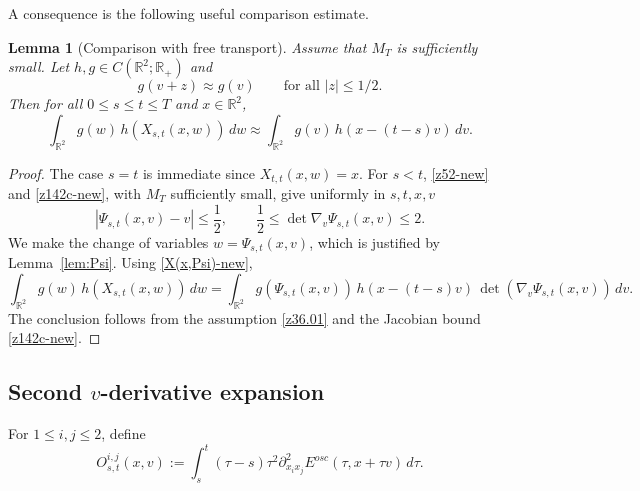 \documentclass[reqno,11pt]{amsart}
\numberwithin{equation}{section}
\newtheorem{lemma}[theorem]{Lemma}
\begin{document}
A consequence is the following useful comparison estimate.
	
	\begin{lemma}[Comparison with free transport]\label{lem:change-var}
		Assume that $M_T$ is sufficiently small.
		Let $h,g\in C(\mathbb{R}^2;\mathbb{R}_+)$ and
		\begin{equation}\label{z36.01}
		g(v+z)\approx g(v)\qquad\text{for all }|z|\leq 1/2.
		\end{equation}
		Then for all $0\leq s\leq t\leq T$ and $x\in\mathbb R^2$,
		\begin{equation}\label{z36}
			\int_{\mathbb{R}^2} g(w)\,h(X_{s,t}(x,w))\,dw\approx \int_{\mathbb{R}^2} g(v)\,h(x-(t-s)v)\,dv.
		\end{equation}
	\end{lemma}
	\begin{proof}
		The case $s=t$ is immediate since $X_{t,t}(x,w)=x$.
		For $s<t$, \eqref{z52-new} and \eqref{z142c-new}, with $M_T$
		sufficiently small, give uniformly in $s,t,x,v$
		\[
		|\Psi_{s,t}(x,v)-v|\leq\frac12,\qquad
		\frac12\leq\det\nabla_v\Psi_{s,t}(x,v)\leq2.
		\]
		We make the change of variables $w=\Psi_{s,t}(x,v)$, which is justified by Lemma~\ref{lem:Psi}. Using \eqref{X(x,Psi)-new},
		\[
		\int_{\mathbb{R}^2} g(w)\,h(X_{s,t}(x,w))\,dw
		=
		\int_{\mathbb{R}^2} g(\Psi_{s,t}(x,v))\,h(x-(t-s)v)\,\det(\nabla_v\Psi_{s,t}(x,v))\,dv.
		\]
		The conclusion follows from the assumption \eqref{z36.01} and the Jacobian bound \eqref{z142c-new}.
	\end{proof}
	
	\subsection{Second $v$-derivative expansion}
	
	For $1\le i,j\le2$, define
	\begin{equation}\label{sec4eq50}
		O_{s,t}^{i,j}(x,v):=\int_s^t(\tau-s)\tau^2\partial_{x_i x_j}^2E^{osc}(\tau, x+\tau v)\,d\tau.
	\end{equation}
	
\end{document}
